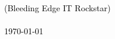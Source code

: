 \newcommand{\cccvname}{Bernd Zuther}
\newcommand{\cccvjobtitle}{Bleeding Edge IT Rockstar}

\NoBgThispage
\vspace*{18.5cm}
\noindent
\textcolor{black}{
{\huge (\cccvjobtitle)}\\
\\[8pt]
{\today}
}


